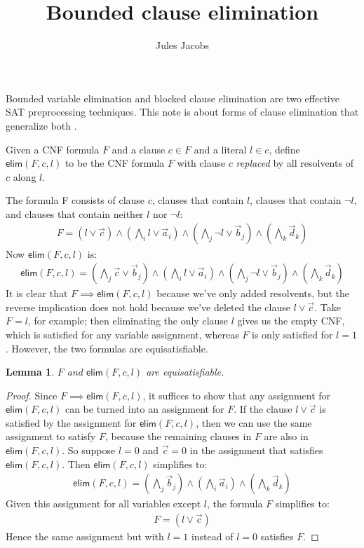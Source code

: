 \documentclass[a4paper, 11pt]{article}
\title{Bounded clause elimination}
\author{Jules Jacobs}
\newtheorem{lemma}[theorem]{Lemma}
\theoremstyle{definition}
\begin{document}
\maketitle

Bounded variable elimination and blocked clause elimination are two effective SAT preprocessing techniques. This note is about forms of clause elimination that generalize both \cite{kiesl17}.

\newcommand{\elim}{\mathsf{elim}}

Given a CNF formula $F$ and a clause $c \in F$ and a literal $l \in c$, define $\elim(F,c,l)$ to be the CNF formula $F$ with clause $c$ \emph{replaced} by all resolvents of $c$ along $l$.

The formula F consists of clause $c$, clauses that contain $l$, clauses that contain $\neg l$, and clauses that contain neither $l$ nor $\neg l$:
\begin{align*}
  F = (l \vee \vec{c}) \wedge (\bigwedge_i l \vee \vec{a}_i) \wedge (\bigwedge_j \neg l \vee \vec{b}_j) \wedge (\bigwedge_k \vec{d}_k)
\end{align*}
Now $\elim(F,c,l)$ is:
\begin{align*}
  \elim(F,c,l) = (\bigwedge_j \vec{c} \vee \vec{b}_j) \wedge (\bigwedge_i l \vee \vec{a}_i) \wedge (\bigwedge_j \neg l \vee \vec{b}_j) \wedge (\bigwedge_k \vec{d}_k)
\end{align*}
It is clear that $F \implies \elim(F,c,l)$ because we've only added resolvents, but the reverse implication does not hold because we've deleted the clause $l \vee \vec{c}$. Take $F = l$, for example; then eliminating the only clause $l$ gives us the empty CNF, which is satisfied for any variable assignment, whereas $F$ is only satisfied for $l = 1$. However, the two formulas are equisatisfiable.

\begin{lemma}
  $F$ and $\elim(F,c,l)$ are equisatisfiable.
\end{lemma}
\begin{proof}
  Since $F \implies \elim(F,c,l)$, it suffices to show that any assignment for $\elim(F,c,l)$ can be turned into an assignment for $F$. If the clause $l \vee \vec{c}$ is satisfied by the assignment for $\elim(F,c,l)$, then we can use the same assignment to satisfy $F$, because the remaining clauses in $F$ are also in $\elim(F,c,l)$. So suppose $l = 0$ and $\vec{c} = 0$ in the assignment that satisfies $\elim(F,c,l)$. Then $\elim(F,c,l)$ simplifies to:
  \begin{align*}
    \elim(F,c,l) = (\bigwedge_j \vec{b}_j) \wedge (\bigwedge_i \vec{a}_i) \wedge (\bigwedge_k \vec{d}_k)
  \end{align*}
  Given this assignment for all variables except $l$, the formula $F$ simplifies to:
  \begin{align*}
    F = (l \vee \vec{c})
  \end{align*}
  Hence the same assignment but with $l = 1$ instead of $l = 0$ satisfies $F$.
\end{proof}
\end{document}
